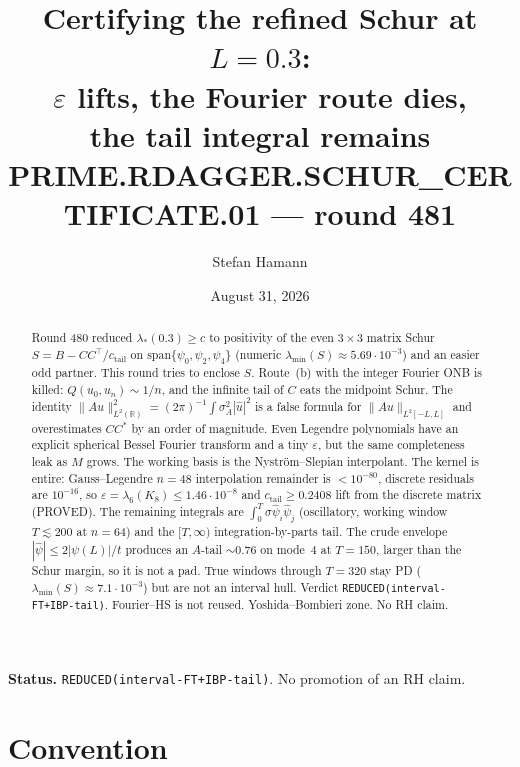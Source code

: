 \documentclass[11pt]{article}
\title{\bfseries Certifying the refined Schur at $L=0.3$:\\[2mm]
$\varepsilon$ lifts, the Fourier route dies,\\[1mm]
the tail integral remains\\[2mm]
\large PRIME.RDAGGER.SCHUR\_CERTIFICATE.01 --- round 481}
\author{Stefan Hamann}
\date{August 31, 2026}
\theoremstyle{remark}
\begin{document}
\maketitle

\begin{abstract}\noindent
Round 480 reduced $\lambda_*(0.3)\ge c$ to positivity of the
even $3\times3$ matrix Schur
$S=B-CC^\top/c_{\mathrm{tail}}$ on
$\mathrm{span}\{\psi_0,\psi_2,\psi_4\}$
(numeric $\lambda_{\min}(S)\approx5.69\cdot10^{-3}$)
and an easier odd partner.
This round tries to enclose $S$.
Route~(b) with the integer Fourier ONB is killed:
$Q(u_0,u_n)\sim1/n$, and the infinite tail of $C$ eats the
midpoint Schur.
The identity
$\|Au\|_{L^2(\mathbb R)}^2=(2\pi)^{-1}\int\sigma_A^2|\hat u|^2$
is a false formula for $\|Au\|_{L^2[-L,L]}$ and overestimates
$CC^*$ by an order of magnitude.
Even Legendre polynomials have an explicit spherical Bessel
Fourier transform and a tiny $\varepsilon$, but the same
completeness leak as $M$ grows.
The working basis is the Nystr\"om--Slepian interpolant.
The kernel is entire: Gauss--Legendre $n=48$ interpolation
remainder is $<10^{-80}$, discrete residuals are $10^{-16}$,
so $\varepsilon=\lambda_6(K_8)\le1.46\cdot10^{-8}$ and
$c_{\mathrm{tail}}\ge0.2408$ lift from the discrete matrix
(PROVED).
The remaining integrals are
$\int_0^T\sigma\hat\psi_i\hat\psi_j$
(oscillatory, working window $T\lesssim200$ at $n=64$)
and the $[T,\infty)$ integration-by-parts tail.
The crude envelope $|\hat\psi|\le2|\psi(L)|/t$ produces an
$A$-tail $\sim0.76$ on mode~$4$ at $T=150$, larger than the
Schur margin, so it is not a pad.
True windows through $T=320$ stay PD
($\lambda_{\min}(S)\approx7.1\cdot10^{-3}$)
but are not an interval hull.
Verdict \texttt{REDUCED(interval-FT+IBP-tail)}.
Fourier--HS is not reused.
Yoshida--Bombieri zone.  No RH claim.
\end{abstract}

\medskip\noindent
\textbf{Status.}\enspace
\texttt{REDUCED(interval-FT+IBP-tail)}.
No promotion of an RH claim.

\begin{center}
\end{center}

\section{Convention}
\end{document}
